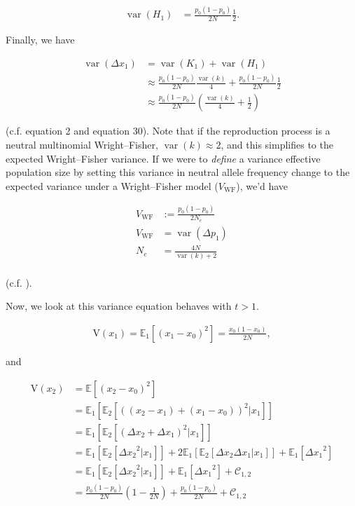 \documentclass[11pt]{article}
\newcommand{\E}{\mathbb{E}}
\newcommand{\V}{\text{V}}
\DeclareMathOperator{\var}{var}
\begin{document}
\begin{align}
  \var(H_1) &= \frac{p_0(1-p_0)}{2N} \frac{1}{2}.
\end{align}

Finally, we have

\begin{align}
  \var(\Delta x_1) &= \var(K_1) + \var(H_1) \\
  &\approx \frac{p_0(1-p_0)}{2N} \frac{\var(k)}{4} + \frac{p_0(1-p_0)}{2N} \frac{1}{2} \\
                   &\approx \frac{p_0(1-p_0)}{2N}\left(\frac{\var(k)}{4} + \frac{1}{2}\right)
\end{align}

(c.f. \cite{Santiago1995-hx} equation 2 and \cite{Buffalo2019-qs} equation 30).
Note that if the reproduction process is a neutral multinomial Wright--Fisher,
$\var(k) \approx 2$, and this simplifies to the expected Wright--Fisher
variance. If we were to \emph{define} a variance effective population size by
setting this variance in neutral allele frequency change to the expected
variance under a Wright--Fisher model ($V_\text{WF}$), we'd have

\begin{align}
  V_\text{WF} &:= \frac{p_0(1-p_0)}{2N_e} \\
  V_\text{WF} &= \var(\Delta p_1) \\
  N_e &= \frac{4N}{\var(k) + 2} \\
\end{align}

(c.f. \cite{Wright1938-tv}).

Now, we look at this variance equation behaves with $t > 1$. 

\begin{align}
  \V(x_1) = \E_1\left[(x_1 - x_0)^2\right]= \frac{x_0(1-x_0)}{2N},
\end{align}

and

\begin{align}
  \label{eq:var_wf}
  \V(x_2) &= \E\left[(x_2 - x_0)^2\right] \\
          &= \E_1\left[\E_2\left[((x_2-x_1) + (x_1 - x_0))^2 | x_1\right]\right] \\
          &= \E_1\left[\E_2\left[(\Delta x_2 + \Delta x_1)^2 | x_1\right]\right] \\
          &= \E_1\left[\E_2\left[{\Delta x_2}^2|x_1\right]\right] + 2\E_1\left[\E_2[\Delta x_2 \Delta x_1 | x_1]\right] + \E_1\left[ {\Delta x_1}^2\right] \\
          &= \E_1\left[\E_2\left[{\Delta x_2}^2|x_1\right]\right] + \E_1\left[ {\Delta x_1}^2\right] + \mathcal{C}_{1,2} \\
          &= \frac{p_0(1-p_0)}{2N}\left(1 - \frac{1}{2N}\right) + \frac{p_0(1-p_0)}{2N} + \mathcal{C}_{1,2}
\end{align}
\end{document}
